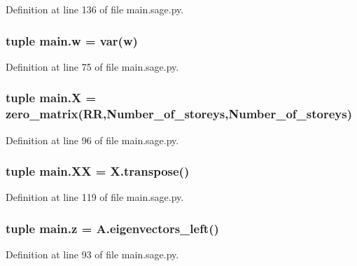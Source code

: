 Definition at line 136 of file main.\+sage.\+py.

\hypertarget{namespacemain_af76005101c339a32cd5d37ba82ee072c}{}
\subsubsection[{w}]{\setlength{\rightskip}{0pt plus 5cm}tuple main.\+w = var(\textquotesingle{}w\textquotesingle{})}\label{namespacemain_af76005101c339a32cd5d37ba82ee072c}


Definition at line 75 of file main.\+sage.\+py.

\hypertarget{namespacemain_a5eac8e4368036ef94463d6e42c1628c5}{}
\subsubsection[{X}]{\setlength{\rightskip}{0pt plus 5cm}tuple main.\+X = zero\+\_\+matrix(R\+R,Number\+\_\+of\+\_\+storeys,Number\+\_\+of\+\_\+storeys)}\label{namespacemain_a5eac8e4368036ef94463d6e42c1628c5}


Definition at line 96 of file main.\+sage.\+py.

\hypertarget{namespacemain_ae18df6a00aee4516c7ad8961b666e2a3}{}
\subsubsection[{X\+X}]{\setlength{\rightskip}{0pt plus 5cm}tuple main.\+X\+X = X.\+transpose()}\label{namespacemain_ae18df6a00aee4516c7ad8961b666e2a3}


Definition at line 119 of file main.\+sage.\+py.

\hypertarget{namespacemain_a2d5b336e3b2f7d2e14f04fa3cc413457}{}
\subsubsection[{z}]{\setlength{\rightskip}{0pt plus 5cm}tuple main.\+z = A.\+eigenvectors\+\_\+left()}\label{namespacemain_a2d5b336e3b2f7d2e14f04fa3cc413457}


Definition at line 93 of file main.\+sage.\+py.

